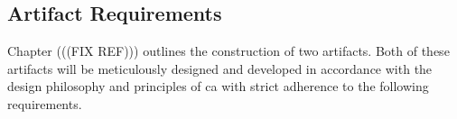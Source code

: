 \subsection{Artifact Requirements} \label{sec_artifact_requirements}

Chapter (((FIX REF))) outlines the construction of two artifacts. Both
of these artifacts will be meticulously designed and developed in accordance with the
design philosophy and principles of \gls{ca} with strict adherence to the following
requirements.




